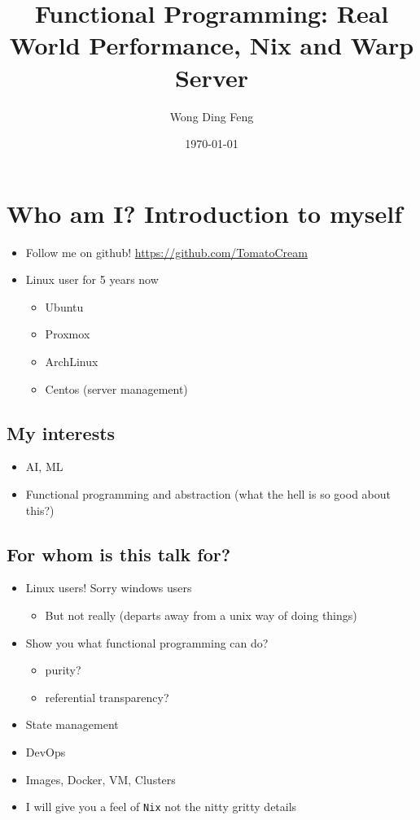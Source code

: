 \documentclass[11pt]{article}
\author{Wong Ding Feng}
\date{\today}
\title{Functional Programming: Real World Performance, Nix and Warp Server}
\begin{document}
\maketitle
\tableofcontents

\section{Who am I? Introduction to myself}
\label{sec:orgac715ce}
\begin{itemize}
\item Follow me on github!
\url{https://github.com/TomatoCream}
\item Linux user for 5 years now
\begin{itemize}
\item Ubuntu
\item Proxmox
\item ArchLinux
\item Centos (server management)
\end{itemize}
\end{itemize}
\subsection{My interests}
\label{sec:org3429dc3}
\begin{itemize}
\item AI, ML
\item Functional programming and abstraction (what the hell is so good about this?)
\end{itemize}
\subsection{For whom is this talk for?}
\label{sec:orgbf30707}
\begin{itemize}
\item Linux users! Sorry windows users
\begin{itemize}
\item But not really (departs away from a unix way of doing things)
\end{itemize}
\item Show you what functional programming can do?
\begin{itemize}
\item purity?
\item referential transparency?
\end{itemize}
\item State management
\item DevOps
\item Images, Docker, VM, Clusters
\item I will give you a feel of \texttt{Nix} not the nitty gritty details
\end{itemize}
\end{document}
